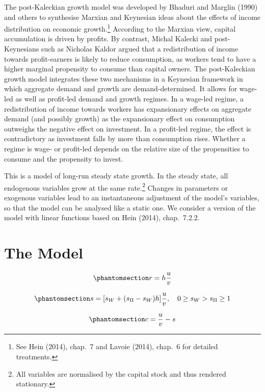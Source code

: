 \documentclass[
  letterpaper,
  DIV=11,
  numbers=noendperiod]{scrreprt}
\begin{document}
The post-Kaleckian growth model was developed by Bhaduri and Marglin
(1990) and others to synthesise Marxian and Keynesian ideas about the
effects of income distribution on economic growth.\footnote{See Hein
  (2014), chap.~7 and Lavoie (2014), chap.~6 for detailed treatments.}
According to the Marxian view, capital accumulation is driven by
profits. By contrast, Michal Kalecki and post-Keynesians such as
Nicholas Kaldor argued that a redistribution of income towards
profit-earners is likely to reduce consumption, as workers tend to have
a higher marginal propensity to consume than capital owners. The
post-Kaleckian growth model integrates these two mechanisms in a
Keynesian framework in which aggregate demand and growth are
demand-determined. It allows for wage-led as well as profit-led demand
and growth regimes. In a wage-led regime, a redistribution of income
towards workers has expansionary effects on aggregate demand (and
possibly growth) as the expansionary effect on consumption outweighs the
negative effect on investment. In a profit-led regime, the effect is
contradictory as investment falls by more than consumption rises.
Whether a regime is wage- or profit-led depends on the relative size of
the propensities to consume and the propensity to invest.

This is a model of long-run steady state growth. In the steady state,
all endogenous variables grow at the same rate.\footnote{All variables
  are normalised by the capital stock and thus rendered stationary.}
Changes in parameters or exogenous variables lead to an instantaneous
adjustment of the model's variables, so that the model can be analysed
like a static one. We consider a version of the model with linear
functions based on Hein (2014), chap.~7.2.2.

\section{The Model}\label{the-model-5}

\begin{equation}\phantomsection\label{eq-r}{
r=h \frac{u}{v}
}\end{equation}

\begin{equation}\phantomsection\label{eq-s}{
s=[s_W + (s_\Pi - s_W)h]\frac{u}{v}, \quad 0 \geq s_W > s_\Pi \geq 1
}\end{equation}

\begin{equation}\phantomsection\label{eq-c}{
c= \frac{u}{v}-s
}\end{equation}
\end{document}
